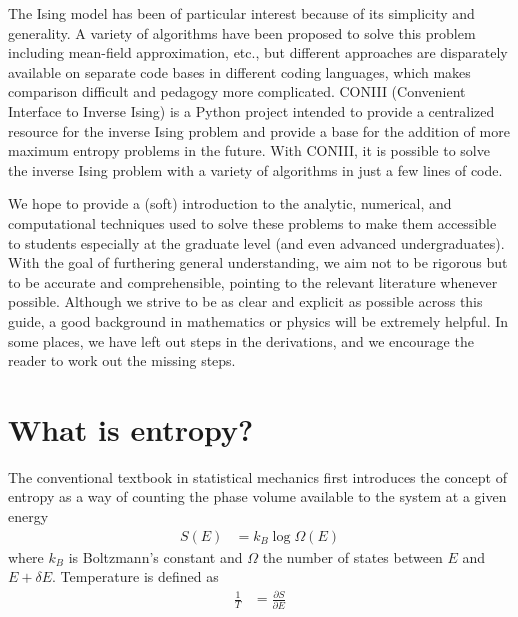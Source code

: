 \documentclass[aps,prl,twocolumn]{revtex4-1}
\begin{document}
The Ising model has been of particular interest because of its simplicity and generality. A variety of algorithms have been proposed to solve this problem including mean-field approximation, etc., but different approaches are disparately available on separate code bases in different coding languages, which makes comparison difficult and pedagogy more complicated.
CONIII (Convenient Interface to Inverse Ising) is a Python project intended to provide a centralized resource for the inverse Ising problem and provide a base for the addition of more maximum entropy problems in the future. With CONIII, it is possible to solve the inverse Ising problem with a variety of algorithms in just a few lines of code.


We hope to provide a (soft) introduction to the analytic, numerical, and computational techniques used to solve these problems to make them accessible to students especially at the graduate level (and even advanced undergraduates). With the goal of furthering general understanding, we aim not to be rigorous but to be accurate and comprehensible, pointing to the relevant literature whenever possible. Although we strive to be as clear and explicit as possible across this guide, a good background in mathematics or physics will be extremely helpful. In some places, we have left out steps in the derivations, and we encourage the reader to work out the missing steps.

\section{What is entropy?}
The conventional textbook in statistical mechanics first introduces the concept of entropy as a way of counting the phase volume available to the system at a given energy
\begin{align}
	S(E) &= k_B \log\Omega(E)
\end{align}
where $k_B$ is Boltzmann's constant and $\Omega$ the number of states between $E$ and $E+\delta E$. Temperature is defined as
\begin{align}
	\frac{1}{T} &= \frac{\partial S}{\partial E}
\end{align}
\end{document}
